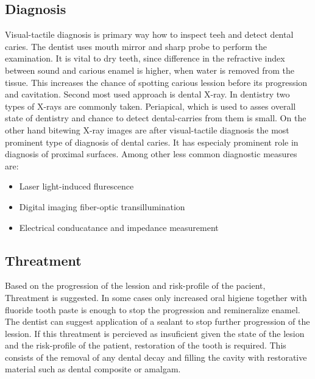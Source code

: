 \subsection{Diagnosis}
Visual-tactile diagnosis is primary way how to inspect teeh and detect dental caries. The dentist uses mouth mirror and sharp probe to perform the examination. It is vital to dry teeth, since difference in the refractive index between sound and carious enamel is higher, when water is removed from the tissue. This increases the chance of spotting carious lession before its progression and cavitation.
Second most used approach is dental X-ray. In dentistry two types of X-rays are commonly taken. Periapical, which is used to asses overall state of dentistry and chance to detect dental-carries from them is small. On the other hand bitewing X-ray images are after visual-tactile diagnosis the most prominent type of diagnosis of dental caries. It has especialy prominent role in diagnosis of proximal surfaces. \newline
Among other less common diagnostic measures are:
\begin{itemize}
    \item Laser light-induced flurescence
    \item Digital imaging fiber-optic transillumination
    \item Electrical conducatance and impedance measurement
\end{itemize}

\subsection{Threatment}
Based on the progression of the lession and risk-profile of the pacient, Threatment is suggested. In some cases only increased oral higiene together with fluoride tooth paste is enough to stop the progression and remineralize enamel. The dentist can suggest application of a sealant to stop further progression of the lession. If this threatment is percieved as insuficient given the state of the lesion and the risk-profile of the patient, restoration of the tooth is required. This consists of the removal of any dental decay and filling the cavity with restorative material such as dental composite or amalgam.

